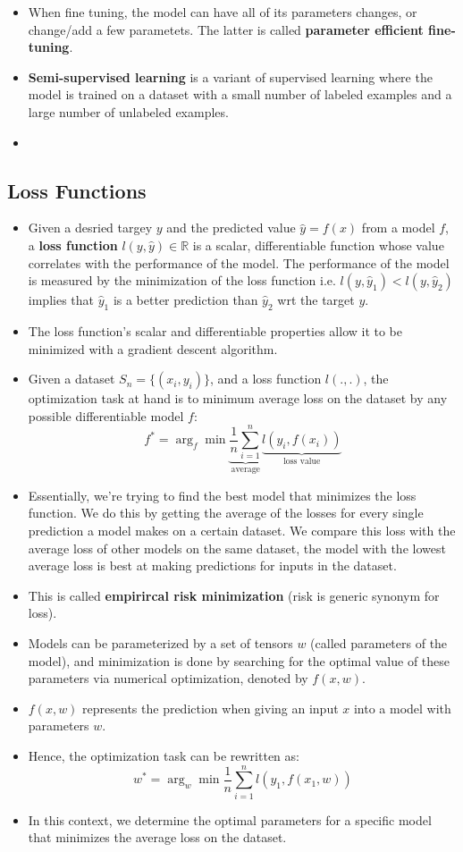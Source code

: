 \documentclass{article}
\newcommand{\tbf}[1]{\textbf{#1}}
\begin{document}
\begin{itemize}
    \item When fine tuning, the model can have all of its parameters changes, or change/add a few parametets. The latter is called \tbf{parameter efficient fine-tuning}.   
    \item \tbf{Semi-supervised learning} is a variant of supervised learning where the model is trained on a dataset with a small number of labeled examples and a large number of unlabeled examples.
    \item 

\end{itemize}

\subsection{Loss Functions}

\begin{itemize}
    \item Given a desried targey $y$ and the predicted value $\hat{y} = f(x)$ from a model $f$, 
    a \tbf{loss function} $l(y, \hat{y}) \in \mathbb{R}$ is a scalar, differentiable function whose value correlates with the performance of the model.
    The performance of the model is measured by the minimization of the loss function i.e. $l(y, \hat{y}_1) < l(y, \hat{y}_2)$ implies that $\hat{y}_1$ is a better prediction than $\hat{y}_2$
    wrt the target $y$.
    \item The loss function's scalar and differentiable properties allow it to be minimized with a gradient descent algorithm. 
    \item Given a dataset $S_n = \{(x_i, y_i)\}$, and a loss function $l(.,.)$, the optimization task at hand is to minimum average loss on the dataset by any possible differentiable model $f$:
    \[f^* = \arg _f\min \underbrace{\frac{1}{n}\sum_{i=1}^{n}}_{\text{average}}\underbrace{l(y_i, f(x_i))}_{\text{loss value}}\]
    \item Essentially, we're trying to find the best model that minimizes the loss function. 
    We do this by getting the average of the losses for every single prediction a model makes on a certain dataset.
    We compare this loss with the average loss of other models on the same dataset, the model with the lowest average loss is best at making predictions for inputs in the dataset. 
    \item This is called \tbf{empirircal risk minimization} (risk is generic synonym for loss).
    \item Models can be parameterized by a set of tensors $w$ (called parameters of the model), 
    and minimization is done by searching for the optimal value of these parameters via numerical optimization, denoted by $f(x,w)$.
    \item $f(x,w)$ represents the prediction when giving an input $x$ into a model with parameters $w$.
    \item Hence, the optimization task can be rewritten as:
    \[w^* = \arg _w \min \frac{1}{n} \sum^n_{i=1}l(y_1, f(x_1,w))\]
    \item In this context, we determine the optimal parameters for a specific model that minimizes the average loss on the dataset. 
\end{itemize}
\end{document}
